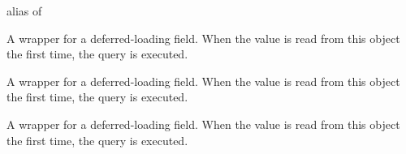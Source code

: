 \documentclass[letterpaper,10pt,english]{sphinxmanual}
\begin{document}
\begin{fulllineitems}
\begin{fulllineitems}
\label{\detokenize{modules/models:gestion.models.HistoricalProduct.instance}}
\end{fulllineitems}


\begin{fulllineitems}
\label{\detokenize{modules/models:gestion.models.HistoricalProduct.instance_type}}
alias of {\hyperref[\detokenize{modules/models:gestion.models.Product}]{}}

\end{fulllineitems}


\begin{fulllineitems}
\label{\detokenize{modules/models:gestion.models.HistoricalProduct.is_active}}
A wrapper for a deferred-loading field. When the value is read from this
object the first time, the query is executed.

\end{fulllineitems}


\begin{fulllineitems}
\label{\detokenize{modules/models:gestion.models.HistoricalProduct.name}}
A wrapper for a deferred-loading field. When the value is read from this
object the first time, the query is executed.

\end{fulllineitems}


\begin{fulllineitems}
\label{\detokenize{modules/models:gestion.models.HistoricalProduct.needQuantityButton}}
A wrapper for a deferred-loading field. When the value is read from this
object the first time, the query is executed.


\end{fulllineitems}
\end{fulllineitems}
\end{document}
